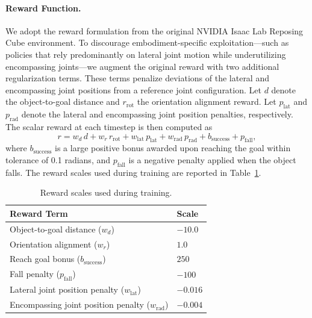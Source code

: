 \paragraph{Reward Function.}
We adopt the reward formulation from the original NVIDIA Isaac Lab Reposing Cube environment. To discourage embodiment-specific exploitation—such as policies that rely predominantly on lateral joint motion while underutilizing encompassing joints—we augment the original reward with two additional regularization terms. These terms penalize deviations of the lateral and encompassing joint positions from a reference joint configuration. Let $d$ denote the object-to-goal distance and $r_{\text{rot}}$ the orientation alignment reward. Let $p_{\text{lat}}$ and $p_{\text{rad}}$ denote the lateral and encompassing joint position penalties, respectively. The scalar reward at each timestep is then computed as
\begin{equation}
    r = w_d \, d + w_r \, r_{\text{rot}} + w_{\text{lat}} \, p_{\text{lat}} + w_{\text{rad}} \, p_{\text{rad}} + b_{\text{success}} + p_{\text{fall}},
\end{equation}
where $b_{\text{success}}$ is a large positive bonus awarded upon reaching the goal within tolerance of 0.1 radians, and $p_{\text{fall}}$ is a negative penalty applied when the object falls. The reward scales used during training are reported in Table~\ref{tab:reward_scales}.

\begin{table}[h]
\centering
\caption{Reward scales used during training.}
\label{tab:reward_scales}
\vspace{-2mm}
\begin{tabular}{ll}
\toprule
\textbf{Reward Term}                              & \textbf{Scale}          \\
\midrule
Object-to-goal distance ($w_d$)                   & $-10.0$                 \\
Orientation alignment ($w_r$)                     & $1.0$                   \\
Reach goal bonus ($b_{\text{success}}$)           & $250$                   \\
Fall penalty ($p_{\text{fall}}$)                  & $-100$                  \\
Lateral joint position penalty ($w_{\text{lat}}$) & $-0.016$                \\
Encompassing joint position penalty ($w_{\text{rad}}$) & $-0.004$           \\
\bottomrule
\end{tabular}
\vspace{-2mm}
\end{table}
